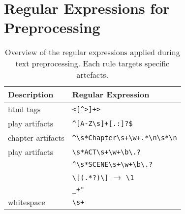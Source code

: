 
\chapter{Regular Expressions for Preprocessing}
\label{app:regex_preproc}

\begin{table}[H]%
  \caption[Regular expressions applied during text preprocessing.]{Overview of the regular expressions applied during text preprocessing. 
            Each rule targets specific artefacts.}
  \label{tab:regex}%
  \centering\small
  \begin{tabular}{@{}ll@{}} %
    \toprule
    \textbf{Description} & \textbf{Regular Expression}  \\
    \midrule
            html tags             & \verb|<[^>]+>| \\
            play artifacts        & \verb|^[A-Z\s]+[.:]?$| \\
            chapter artifacts     & \verb|^\s*Chapter\s+\w+.*\n\s*\n| \\
            play artifacts        & \verb|\s*ACT\s+\w+\b\.?| \\
                                  & \verb|^\s*SCENE\s+\w+\b\.?| \\
                                  & \verb|\[(.*?)\]| $\rightarrow$ \verb|\1| \\
                                  & \verb|_+"| \\
            whitespace           & \verb|\s+| \\


    \bottomrule
  \end{tabular}
\end{table}
